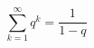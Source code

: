 \documentclass[14pt]{article}
\begin{document}
\pagestyle{empty}
\[ \sum\limits_{k=1}^{\infty} q^k = \frac{1}{1-q} \]
\end{document}
